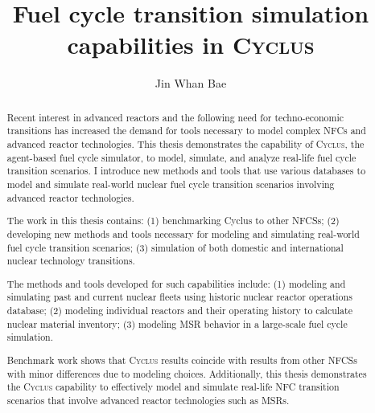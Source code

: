 \documentclass{report}
\newcommand{\Cyclus}{\textsc{Cyclus}\xspace}%
\begin{document}
\title{Fuel cycle transition simulation capabilities in \Cyclus}

\author{Jin Whan Bae}
\maketitle


\begin{abstract}

Recent interest in advanced reactors and the following need for techno-economic
transitions has increased the demand for tools necessary
to model complex \glspl{NFC} and advanced reactor technologies.
This thesis demonstrates the capability of \Cyclus, the
agent-based fuel cycle simulator, to model, simulate, and analyze
real-life fuel cycle transition scenarios. I introduce new methods
and tools that use various databases to model and simulate real-world
nuclear fuel cycle transition scenarios involving advanced reactor
technologies.

The work in this thesis contains:
(1) benchmarking
Cyclus to other \glspl{NFCS};
(2) developing new methods and tools necessary for modeling and simulating
real-world fuel cycle transition scenarios; (3)
simulation of both domestic and international nuclear technology
transitions.

The methods and tools developed for such capabilities include:
(1) modeling and simulating past and current
nuclear fleets using historic nuclear reactor operations
database; (2) modeling individual reactors and their operating history
to calculate nuclear material inventory; (3) modeling \gls{MSR} behavior
in a large-scale fuel cycle simulation.

Benchmark work shows that \Cyclus results coincide
with results from other \glspl{NFCS} with minor differences
due to modeling choices.
Additionally, this thesis demonstrates the \Cyclus capability to effectively
model and simulate real-life \gls{NFC} transition scenarios
that involve advanced reactor technologies such as \glspl{MSR}.

\end{abstract}
\end{document}
